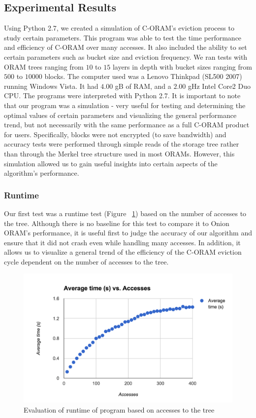 \documentclass[12pt, oneside]{article}   	%
\begin{document}
\subsection{Experimental Results}

Using Python 2.7, we created a simulation of C-ORAM's eviction process to study certain parameters. This program was able to test the time performance and efficiency of C-ORAM over many accesses. It also included the ability to set certain parameters such as bucket size and eviction frequency. We ran tests with ORAM trees ranging from $10$ to $15$ layers in depth with bucket sizes ranging from $500$ to $10000$ blocks. The computer used was a Lenovo Thinkpad (SL500 2007) running Windows Vista. It had $4.00$ gB of RAM, and a $2.00$ gHz Intel Core2 Duo CPU. The programs were interpreted with Python 2.7. It is important to note that our program was a simulation - very useful for testing and determining the optimal values of certain parameters and visualizing the general performance trend, but not necessarily with the same performance as a full C-ORAM product for users. Specifically, blocks were not encrypted (to save bandwidth) and accuracy tests were performed through simple reads of the storage tree rather than through the Merkel tree structure used in most ORAMs. However, this simulation allowed us to gain useful insights into certain aspects of the algorithm's performance. 
\subsubsection{Runtime}
Our first test was a runtime test (Figure ~\ref{fig:runtimegraph}) based on the number of accesses to the tree. Although there is no baseline for this test to compare it to Onion ORAM's performance, it is useful first to judge the accuracy of our algorithm and ensure that it did not crash even while handling many accesses. In addition, it allows us to visualize a general trend of the efficiency of the C-ORAM eviction cycle dependent on the number of accesses to the tree.

\begin{figure}[H]
  \includegraphics[width=\linewidth]{runtimegraph}
  \caption{Evaluation of runtime of program based on accesses to the tree}
  \label{fig:runtimegraph}
\end{figure}
\end{document}
